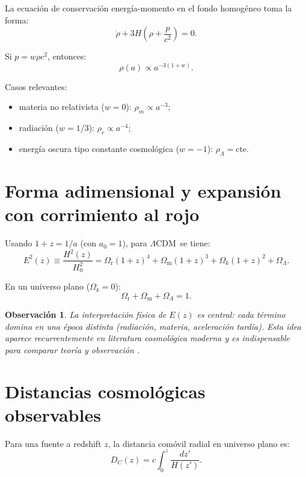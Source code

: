 \documentclass[12pt,oneside]{book}
\newtheorem{observacion}{Observación}[chapter]
\newcommand{\LCDM}{$\Lambda$CDM}
\newcommand{\OmM}{\Omega_{\mathrm{m}}}
\newcommand{\OmL}{\Omega_{\Lambda}}
\newcommand{\OmR}{\Omega_{\mathrm{r}}}
\newcommand{\Omk}{\Omega_{k}}
\begin{document}
La ecuación de conservación energía-momento en el fondo homogéneo toma la forma:
\begin{equation}
  \dot\rho + 3H\left(\rho+\frac{p}{c^2}\right)=0.
\end{equation}

Si $p=w\rho c^2$, entonces:
\begin{equation}
  \rho(a)\propto a^{-3(1+w)}.
\end{equation}

Casos relevantes:
\begin{itemize}[leftmargin=1.5em]
  \item materia no relativista ($w=0$): $\rho_m\propto a^{-3}$;
  \item radiación ($w=1/3$): $\rho_r\propto a^{-4}$;
  \item energía oscura tipo constante cosmológica ($w=-1$): $\rho_\Lambda=\text{cte}$.
\end{itemize}

\section{Forma adimensional y expansión con corrimiento al rojo}

Usando $1+z=1/a$ (con $a_0=1$), para \LCDM\ se tiene:
\begin{equation}
  E^2(z)\equiv\frac{H^2(z)}{H_0^2}=
  \OmR(1+z)^4+\OmM(1+z)^3+\Omk(1+z)^2+\OmL.
\end{equation}

En un universo plano ($\Omk=0$):
\begin{equation}
  \OmR+\OmM+\OmL=1.
\end{equation}

\begin{observacion}
La interpretación física de $E(z)$ es central: cada término domina en una época distinta
(radiación, materia, aceleración tardía). Esta idea aparece recurrentemente en literatura
cosmológica moderna y es indispensable para comparar teoría y observación
\citep{dodelson,ryden,arxiv2603,arxiv2001,srep2024}.
\end{observacion}

\section{Distancias cosmológicas observables}

Para una fuente a redshift $z$, la distancia comóvil radial en universo plano es:
\begin{equation}
  D_C(z)=c\int_0^z\frac{dz'}{H(z')}.
\end{equation}
\end{document}
